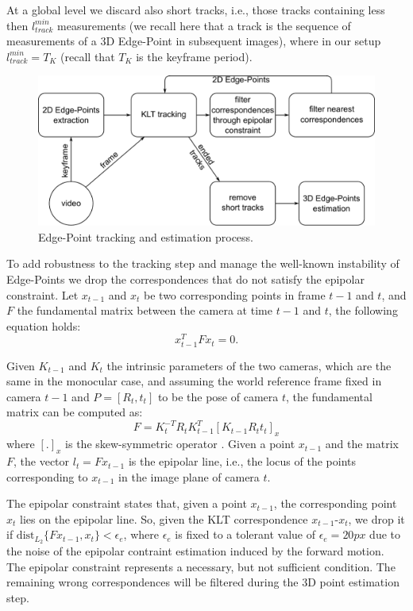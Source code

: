 At a global level we discard also short tracks, i.e., those tracks containing less then $l_{track}^{min}$ measurements (we recall here that a track is the sequence of measurements of a 3D Edge-Point in subsequent images), where in our setup $l_{track}^{min} = T_K$ (recall that $T_K$ is the keyframe period). 


\begin{figure}[t]
\centering
\includegraphics[width=0.8\columnwidth]{./img//EdgePoint}
\caption{Edge-Point tracking and estimation process.}
\label{fig:algorithm}
\end{figure}

To add robustness to the tracking step and manage the well-known instability  of Edge-Points  we drop the correspondences that do not satisfy the epipolar constraint. 
Let $x_{t-1}$ and $x_t$ be two corresponding points in frame $t-1$ and $t$, and $F$ the fundamental matrix between the camera at time $t-1$ and $t$, the following equation holds:
\[
 x_{t-1}^{T}Fx_t = 0 .
\]

Given $K_{t-1}$ and $K_t$ the intrinsic parameters of the two cameras, which are the same in the monocular case, and assuming the world reference frame fixed in camera $t-1$ and $P = [R_t,t_t]$ to be the pose of camera $t$, the fundamental matrix can be computed as:
\[
F = K_t^{-T}R_tK_{t-1}^T [K_{t-1}R_{t}t_t]_x
\]
where $[.]_x$ is the skew-symmetric operator \cite{hazi04}.
Given a point $x_{t-1}$ and the matrix $F$, the vector $l_{t} = Fx_{t-1}$ is the epipolar line, i.e., the locus of the points corresponding to $x_{t-1}$ in the image plane of camera $t$. 

The epipolar constraint states that, given a point $x_{t-1}$, the corresponding point $x_{t}$ lies on the epipolar line. So, given the KLT correspondence $x_{t-1}$-${x}_{t}$, we drop it if $\text{dist}_{L_2}\{Fx_{t-1}, {x}_{t}\} <\epsilon_e$, where $\epsilon_e$ is fixed to a tolerant value of $\epsilon_e = 20px$ due to the noise of the epipolar contraint estimation induced by the forward motion.
The epipolar constraint represents a necessary, but not sufficient condition. The remaining wrong correspondences will be filtered during the 3D point estimation step.


